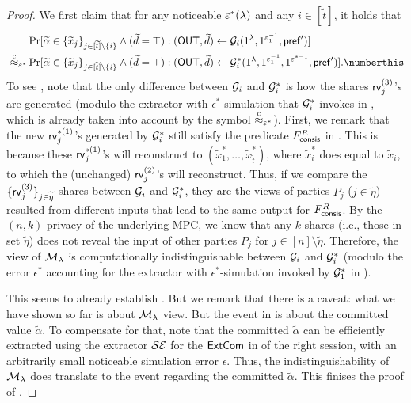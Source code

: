 \begin{proof}
We first claim that for any noticeable $\varepsilon^*(\lambda)$ and any $i \in [\tilde{t}]$, it holds that 
 \begin{align*}
& \Pr[\tilde{\alpha} \in \Set{\tilde{x}_j}_{j \in [\tilde{t}] \setminus \Set{i}} \wedge (\tilde{d} = \top): (\OUT,\tilde{d}) \gets \mcal{G}_i(1^\secpar, 1^{\epsilon_1^{-1}},  \msf{pref}')] \\ 
~ \cind_{\epsilon^*}& 
\Pr[\tilde{\alpha} \in \Set{\tilde{x}_j}_{j \in [\tilde{t}] \setminus \Set{i}} \wedge (\tilde{d} = \top): (\OUT,\tilde{d}) \gets \mcal{G}^*_i(1^\secpar, 1^{\epsilon_1^{-1}},1^{\epsilon^{*-1}},  \msf{pref}')]. \numberthis \label{eq:ind:Gi:G*i}
\end{align*}
To see , note that the only difference between $\mathcal{G}_i$ and $\mathcal{G}^*_i$ is how the shares $\mathsf{rv}^{(3)}_j$'s are generated (modulo the extractor with $\epsilon^*$-simulation that $\mathcal{G}^*_i$ invokes in , which is already taken into account by the symbol $\stackrel{\text{c}}{\approx}_{\varepsilon^*}$). First, we remark that the new $\mathsf{rv}^{*(1)}_j$'s generated by $\mathcal{G}^*_i$ still satisfy the predicate $F^R_{\mathsf{consis}}$ in . This is because these $\mathsf{rv}^{*(1)}_j$'s will reconstruct to $(\tilde{x}^*_1, \ldots, \tilde{x}^*_{\tilde{t}})$, where  $\tilde{x}^*_i$ does equal to $\tilde{x}_i$, to which the (unchanged) $\mathsf{rv}^{(2)}_j$'s will reconstruct. Thus, if we compare the $\{\mathsf{rv}^{(3)}_j\}_{j\in \widetilde{\eta}}$ shares between $\mathcal{G}_i$ and $\mathcal{G}^*_i$, they are the views of parties $P_j$ ($j\in \tilde{\eta}$) resulted from different inputs that lead to the same output for $F^R_{\mathsf{consis}}$. By the $(n,k)$-privacy of the underlying MPC, we know that any $k$ shares (i.e., those in set $\tilde{\eta}$) does not reveal the input of other parties $P_j$ for $j \in [n]\setminus \tilde{\eta}$. Therefore, the view of $\mathcal{M}_\lambda$ is computationally indistinguishable between $\mathcal{G}_i$ and $\mathcal{G}^*_i$ (modulo the error $\epsilon^*$ accounting for the extractor with $\epsilon^*$-simulation invoked by $\mathcal{G}^*_1$ in ). 

This seems to already establish . But we remark that there is a caveat: what we have shown so far is about $\mathcal{M}_\lambda$ view. But the event in  is about the committed value $\tilde{\alpha}$. To compensate for that, note that the committed $\tilde{\alpha}$ can be efficiently extracted using the extractor $\mathcal{SE}$ for the $\mathsf{ExtCom}$ in  of the right session, with an arbitrarily small noticeable simulation error $\epsilon$. Thus, the indistinguishability of $\mathcal{M}_\lambda$ does translate to the event regarding the committed $\tilde{\alpha}$. This finises the proof of . 



\end{proof}
